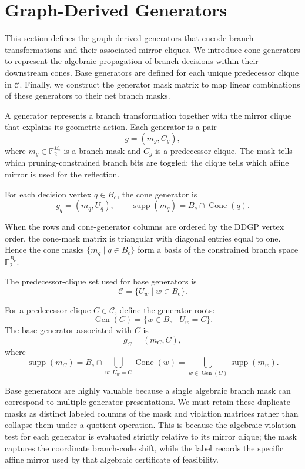 \section{Graph-Derived Generators}
\label{sec:generators}

This section defines the graph-derived generators that encode branch transformations and their associated mirror cliques. We introduce cone generators to represent the algebraic propagation of branch decisions within their downstream cones. Base generators are defined for each unique predecessor clique in $\mathcal{C}$. Finally, we construct the generator mask matrix to map linear combinations of these generators to their net branch masks.

A generator represents a branch transformation together with the mirror clique that explains its geometric action. Each generator is a pair
\[
g=(m_g, C_g),
\]
where $m_g \in \mathbb{F}_2^{B_{\mathrm{c}}}$ is a branch mask and $C_g$ is a predecessor clique. The mask tells which pruning-constrained branch bits are toggled; the clique tells which affine mirror is used for the reflection.

\begin{definition}
\label{def:cone-generator}
For each decision vertex $q \in B_{\mathrm{c}}$, the cone generator is
\[
g_q = (m_q, U_q),
\qquad
\operatorname{supp}(m_q) = B_{\mathrm{c}} \cap \operatorname{Cone}(q).
\]
\end{definition}

When the rows and cone-generator columns are ordered by the DDGP vertex order, the cone-mask matrix is triangular with diagonal entries equal to one. Hence the cone masks $\{m_q \mid q\in B_{\mathrm{c}}\}$ form a basis of the constrained branch space $\mathbb{F}_2^{B_{\mathrm{c}}}$.

The predecessor-clique set used for base generators is
\[
\mathcal{C}=\{U_w\mid w\in B_{\mathrm{c}}\}.
\]

\begin{definition}
\label{def:base-generator}
For a predecessor clique $C\in\mathcal{C}$, define the generator roots:
\[
\operatorname{Gen}(C)=\{w \in B_{\mathrm{c}} \mid U_w = C\}.
\]
The base generator associated with $C$ is
\[
g_C=(m_C, C),
\]
where
\[
\operatorname{supp}(m_C)
=
B_{\mathrm{c}} \cap \bigcup_{w:\,U_w=C} \operatorname{Cone}(w)
=
\bigcup_{w\in \operatorname{Gen}(C)} \operatorname{supp}(m_w).
\]
\end{definition}

Base generators are highly valuable because a single algebraic branch mask can correspond to multiple generator presentations. We must retain these duplicate masks as distinct labeled columns of the mask and violation matrices rather than collapse them under a quotient operation. This is because the algebraic violation test for each generator is evaluated strictly relative to its mirror clique; the mask captures the coordinate branch-code shift, while the label records the specific affine mirror used by that algebraic certificate of feasibility.

